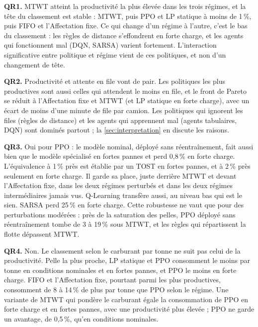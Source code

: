 \documentclass[11pt,a4paper]{article}
\newif\ifrevmarks
\newcommand{\revtag}[1]{\ifrevmarks\textsuperscript{\textcolor{red!70!black}{\scriptsize[#1]}}\fi}
\newenvironment{revbloc}[1]{\par\ifrevmarks\color{revcolor}\noindent\revtag{#1}\ \fi}{\par}
\newif\ifcorrmarks
\newcommand{\corr}[1]{\ifcorrmarks\textcolor{corrcolor}{#1}\else#1\fi}
\begin{document}
\begin{revbloc}{T31}
\textbf{QR1.} MTWT atteint la productivité la plus élevée dans les trois régimes, et la tête du classement est stable : MTWT, puis PPO et \corr{LP statique} à moins de 1\,\%, puis FIFO et l'Affectation fixe. Ce qui change d'un régime à l'autre, c'est le bas du classement : les règles de distance s'effondrent en forte charge, et les agents qui fonctionnent mal (DQN, SARSA) varient fortement. L'interaction significative entre politique et régime vient de ces politiques, et non d'un changement de tête.

\textbf{QR2.} Productivité et attente en file vont de pair. Les politiques les plus productives sont aussi celles qui attendent le moins en file, et le front de Pareto se réduit à l'Affectation fixe et MTWT (et \corr{LP statique} en forte charge), avec un écart de moins d'une minute de file par camion. \corr{Les politiques qui ignorent les files (règles de distance) et les agents qui apprennent mal (agents tabulaires, DQN) sont dominés partout ; la \cref{sec:interpretation} en discute les raisons.}

\textbf{QR3.} Oui pour PPO : le modèle nominal, déployé sans réentraînement, fait aussi bien que le modèle spécialisé en fortes pannes et perd 0,8\,\% en forte charge. \corr{L'équivalence à 1\,\% près est établie par un TOST en fortes pannes, et à 2\,\% près seulement en forte charge.} Il garde sa place, juste derrière MTWT et devant l'Affectation fixe, dans les deux régimes perturbés et dans les deux régimes intermédiaires jamais vus. Q-Learning transfère aussi, au niveau bas qui est le sien. SARSA perd 25\,\% en forte charge. \corr{Cette robustesse ne vaut que pour des perturbations modérées : près de la saturation des pelles, PPO déployé sans réentraînement tombe de 3 à 19\,\% sous MTWT, et les règles qui répartissent la flotte dépassent MTWT.}

\textbf{QR4.} Non. Le classement selon le carburant par tonne ne suit pas celui de la productivité. Pelle la plus proche, \corr{LP statique} et PPO consomment le moins par tonne en conditions nominales et en fortes pannes, et PPO le moins en forte charge. FIFO et l'Affectation fixe, pourtant parmi les plus productives, consomment de 8 à 14\,\% de plus par tonne que PPO selon le régime. \corr{Une variante de MTWT qui pondère le carburant égale la consommation de PPO en forte charge et en fortes pannes, avec une productivité plus élevée ; PPO ne garde un avantage, de 0,5\,\%, qu'en conditions nominales.}
\end{revbloc}
\end{document}
